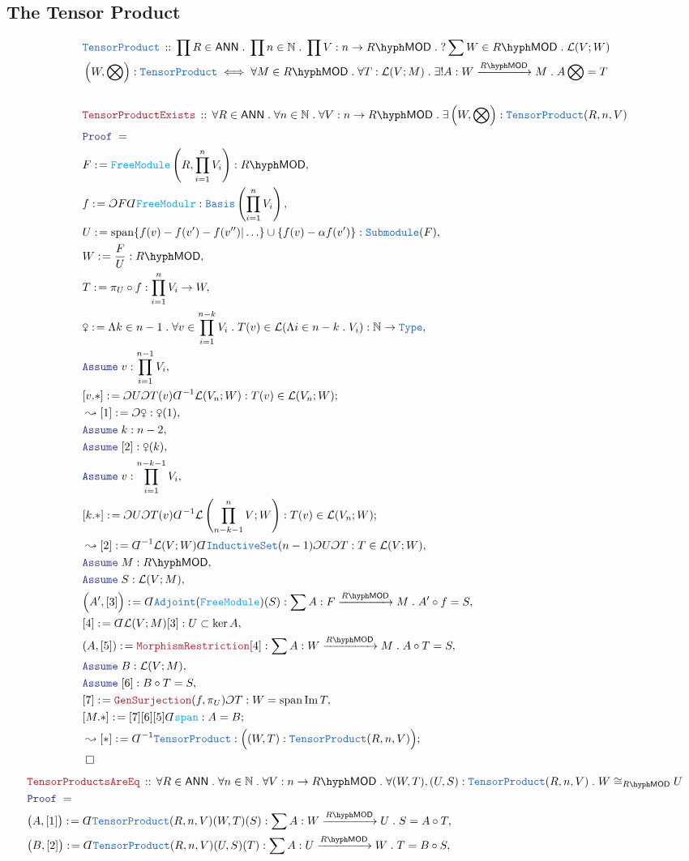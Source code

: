 \documentclass[12pt]{scrartcl}%
\newcommand{\TYPE}[1]{\textcolor{NavyBlue}{\mathtt{#1}}}%
\newcommand{\FUNC}[1]{\textcolor{Cerulean}{\mathtt{#1}}}%
\newcommand{\LOGIC}[1]{\textcolor{Blue}{\mathtt{#1}}}%
\newcommand{\THM}[1]{\textcolor{Maroon}{\mathtt{#1}}}%
\renewcommand{\.}{\; . \;} %
\newcommand{\de}{: \kern 0.1pc =} %
\newcommand{\Act}[1]{\left( #1 \right)} %
\newcommand{\Theorem}[2]{& \THM{#1} \, :: \, #2 \\ & \Proof = \\ } %
\newcommand{\DeclareType}[2]{& \TYPE{#1} \, :: \, #2 \\}%
\newcommand{\DefineType}[3]{& #1 : \TYPE{#2} \iff #3 \\}%
\newcommand{\Page}[1]{ \begin{align*} #1 \end{align*}  }%
\newcommand{ \bd }{ \ByDef }%
\newcommand{\Type}{\TYPE{Type}}%
\newcommand{\Nat}{\mathbb{N}}%
\DeclareMathOperator*{\im}{Im}%
\newcommand{\Say}[3]{& #1 \de #2 : #3, \\} %
\newcommand{\Conclude}[3]{& #1 \de #2 : #3; \\}%
\newcommand{\Derive}[3]{& \leadsto #1 \de #2 : #3, \\} %
\newcommand{\DeriveConclude}[3]{& \leadsto #1 \de #2 : #3 ; \\} %
\newcommand{\Assume}[2]{& \LOGIC{Assume} \; #1 : #2, \\} %
\newcommand{\QED}{\; \square} %
\newcommand{\EndProof}{& \QED \\} %
\newcommand{\ByDef}{\rotatebox[origin=c]{-180}{$D$}}%
\newcommand{\ByConstr}{\rotatebox[origin=c]{-180}{$C$}}%
\newcommand{\Proof}{\LOGIC{Proof} \; } %
\newcommand{\Arrow}[1]{\xrightarrow{#1}}%
\newcommand{\Basis}{\TYPE{Basis}} %
\DeclareMathOperator{\Span}{span} %
\newcommand{\LMOD}[1]{#1\hyph\mathsf{MOD}} %
\renewcommand{\L}{\mathcal{L}}
\newcommand{\ANN}{\mathsf{ANN}} %
\begin{document}
\subsection{The Tensor Product}
\Page{
	\DeclareType{TensorProduct}{\prod R \in \ANN \. \prod n \in \Nat \. \prod V : n \to \LMOD{R} \. ? \sum W \in \LMOD{R} \. \L(V;W) }
	\DefineType{\left(W ,\bigotimes \right)}{TensorProduct}{ \forall M \in \LMOD{R} \. \forall T : \L(V;M) \. \exists! A : W \Arrow{\LMOD{R}} M \. A\bigotimes = T}
	\\
	\Theorem{TensorProductExists}{\forall R \in \ANN \. \forall n \in \Nat \. \forall V : n \to \LMOD{R} \. 
		\exists \left(W,\bigotimes\right) : \TYPE{TensorProduct}(R,n,V)}
	\Say{F}{\FUNC{FreeModule}\Act{R,\prod^n_{i=1} V_i}}{\LMOD{R}}
	\Say{f}{\ByConstr F \bd \FUNC{FreeModulr}}{ \Basis\Act{\prod^n_{i=1} V_i} }
	\Say{U}{\Span \{  f(v) - f(v') - f(v'') | \ldots  \}\cup\{ f(v) - \alpha f(v') \}}{\TYPE{Submodule}(F)}
	\Say{W}{\frac{F}{U}}{\LMOD{R}}
	\Say{T}{\pi_U \circ f}{ \prod^n_{i=1} V_i  \to W }
	\Say{\venus}{\Lambda k \in n-1 \. \forall v \in \prod^{n-k}_{i=1} V_i \. T(v) \in \L(\Lambda i \in n-k \. V_i) }{\Nat \to \Type}
	\Assume{v}{\prod^{n-1}_{i=1} V_i}
	\Conclude{[v.*]}{\ByConstr U \ByConstr T(v) \bd^{-1} \L(V_n;W)}{ T(v) \in \L(V_n;W)  }
	\Derive{[1]}{\ByConstr \venus}{ \venus(1) } 
	\Assume{k}{n-2}
	\Assume{[2]}{\venus(k)}
	\Assume{v}{\prod_{i=1}^{n-k-1} V_i}
	\Conclude{[k.*]}{\ByConstr U \ByConstr T(v) \bd^{-1} \L\left(\prod^n_{n-k-1}V;W\right)}{ T(v) \in \L(V_n;W)  }
	\Derive{[2]}{\bd^{-1} \L(V;W)\bd \TYPE{InductiveSet}(n-1)\ByConstr U \ByConstr T}{T \in \L(V;W)}
	\Assume{M}{\LMOD{R}}
	\Assume{S}{\L(V;M)}
	\Say{\Big(A',[3]\Big)}{\bd \TYPE{Adjoint}(\FUNC{FreeModule})(S)}{\sum A :  F \Arrow{\LMOD{R}} M \. A' \circ f = S}
	\Say{[4]}{\bd \L(V;M)[3]}{  U \subset \ker A  }
	\Say{ (A,[5])  }{\THM{MorphismRestriction}[4]}{ \sum A  : W \Arrow{\LMOD{R}} M \. A \circ T = S   }
	\Assume{B}{\L(V;M)}
	\Assume{[6]}{B \circ T = S}
	\Say{[7]}{\THM{GenSurjection}(f,\pi_U)\ByConstr T }{ W = \Span \im T}
	\Conclude{[M.*] }{[7][6][5]\bd \FUNC{span}}{A = B}
	\DeriveConclude{[*]}{\bd^{-1} \TYPE{TensorProduct}}{\Big( (W,T) : \TYPE{TensorProduct}(R,n,V) \Big) }
	\EndProof
}\Page{
	\Theorem{TensorProductsAreEq}{\forall R \in \ANN \. \forall n \in \Nat \. \forall V : n \to \LMOD{R} \. 
		\forall (W,T),(U,S) : \TYPE{TensorProduct}(R,n,V) \. W \cong_{\LMOD{R}} U}
	\Say{\big(A,[1]\big)}{\bd \TYPE{TensorProduct}(R,n,V)(W,T)(S)}{\sum A : W \Arrow{\LMOD{R}} U \. S = A \circ T}
	\Say{\big(B,[2]\big)}{\bd \TYPE{TensorProduct}(R,n,V)(U,S)(T)}{\sum A : U \Arrow{\LMOD{R}} W \. T = B \circ S}
}
\end{document}
